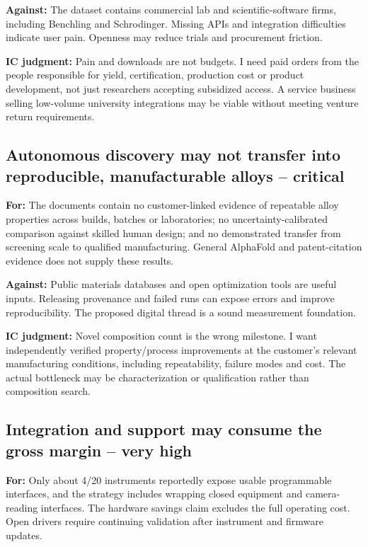 \textbf{Against:} The dataset contains commercial lab and
scientific-software firms, including Benchling and Schrodinger. Missing
APIs and integration difficulties indicate user pain. Openness may
reduce trials and procurement friction.

\textbf{IC judgment:} Pain and downloads are not budgets. I need paid
orders from the people responsible for yield, certification, production
cost or product development, not just researchers accepting subsidized
access. A service business selling low-volume university integrations
may be viable without meeting venture return requirements.

\subsection{Autonomous discovery may not transfer into reproducible,
manufacturable alloys --
critical}\label{autonomous-discovery-may-not-transfer-into-reproducible-manufacturable-alloys-critical}

\textbf{For:} The documents contain no customer-linked evidence of
repeatable alloy properties across builds, batches or laboratories; no
uncertainty-calibrated comparison against skilled human design; and no
demonstrated transfer from screening scale to qualified manufacturing.
General AlphaFold and patent-citation evidence does not supply these
results. \citep{InputBrief,Bryan2021,InputProposal}

\textbf{Against:} Public materials databases and open optimization tools
are useful inputs. Releasing provenance and failed runs can expose
errors and improve reproducibility. The proposed digital thread is a
sound measurement foundation.

\textbf{IC judgment:} Novel composition count is the wrong milestone. I
want independently verified property/process improvements at the
customer's relevant manufacturing conditions, including repeatability,
failure modes and cost. The actual bottleneck may be characterization or
qualification rather than composition search.

\subsection{Integration and support may consume the gross margin -- very
high}\label{integration-and-support-may-consume-the-gross-margin-very-high}

\textbf{For:} Only about 4/20 instruments reportedly expose usable
programmable interfaces, and the strategy includes wrapping closed
equipment and camera-reading interfaces. The hardware savings claim
excludes the full operating cost. Open drivers require continuing
validation after instrument and firmware updates.
\citep{InputRecommendations,Pearce2020}

